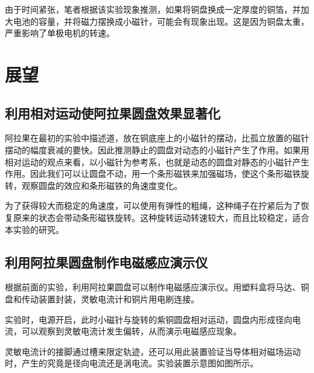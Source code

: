 \documentclass{CLGPY}
\begin{document}
\begin{multicols}{1}
由于时间紧张，笔者根据该实验现象推测，如果将铜盘换成一定厚度的铜箔，并加大电池的容量，并将磁力摆换成小磁针，可能会有现象出现。这是因为铜盘太重，严重影响了单极电机的转速。

\section{展望}
\subsection{利用相对运动使阿拉果圆盘效果显著化}
阿拉果在最初的实验中描述道，放在铜底座上的小磁针的摆动，比孤立放置的磁针摆动的幅度衰减的要快。因此推测静止的圆盘对动态的小磁针产生了作用。如果用相对运动的观点来看，以小磁针为参考系，也就是动态的圆盘对静态的小磁针产生作用。因此我们可以让圆盘不动，用一个条形磁铁来加强磁场，使这个条形磁铁旋转，观察圆盘的效应和条形磁铁的角速度变化。

为了获得较大而稳定的角速度，可以使用有弹性的粗绳，这种绳子在拧紧后为了恢复原来的状态会带动条形磁铁旋转。这种旋转运动转速较大，而且比较稳定，适合本实验的研究。
\subsection{利用阿拉果圆盘制作电磁感应演示仪}
根据前面的实验，利用阿拉果圆盘可以制作电磁感应演示仪。用塑料盒将马达、铜盘和传动装置封装，灵敏电流计和铜片用电刷连接。

实验时，电源开启，此时小磁针与旋转的紫铜圆盘相对运动，圆盘内形成径向电流，可以观察到灵敏电流计发生偏转，从而演示电磁感应现象。

灵敏电流计的接脚通过槽来限定轨迹，还可以用此装置验证当导体相对磁场运动时，产生的究竟是径向电流还是涡电流。实验装置示意图如图所示。


\end{multicols}
\end{document}
